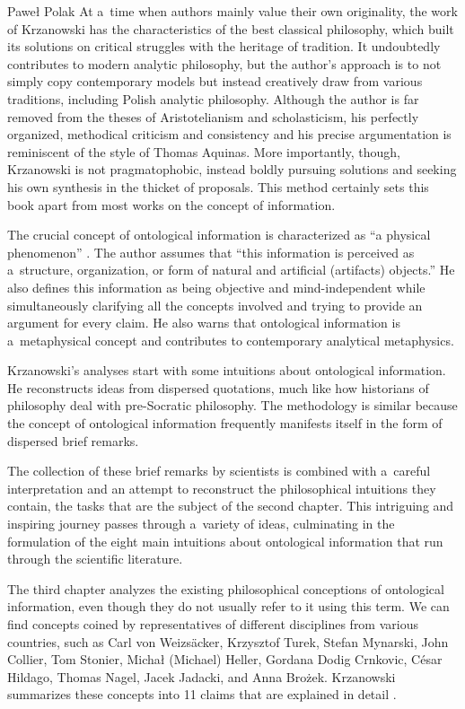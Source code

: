 \begin{newrevengenv}{Paweł Polak}
At a~time when authors mainly value their own originality, the work of Krzanowski has the characteristics of the best classical philosophy, which built its solutions on critical struggles with the heritage of tradition. It undoubtedly contributes to modern analytic philosophy, but the author's approach is to not simply copy contemporary models but instead creatively draw from various traditions, including Polish analytic philosophy. Although the author is far removed from the theses of Aristotelianism and scholasticism, his perfectly organized, methodical criticism and consistency and his precise argumentation is reminiscent of the style of Thomas Aquinas. More importantly, though, Krzanowski is not pragmatophobic, instead boldly pursuing solutions and seeking his own synthesis in the thicket of proposals. This method certainly sets this book apart from most works on the concept of information.

The crucial concept of ontological information is characterized as ``a physical phenomenon''
\parencite[][p.6]{krzanowski_ontological_2022}. %
 The author assumes that ``this information is perceived as a~structure, organization, or form of natural and artificial (artifacts) objects.'' He also defines this information as being objective and mind-independent while simultaneously clarifying all the concepts involved and trying to provide an argument for every claim. He also warns that ontological information is a~metaphysical concept and contributes to contemporary analytical metaphysics.

Krzanowski's analyses start with some intuitions about ontological information. He reconstructs ideas from dispersed quotations, much like how historians of philosophy deal with pre-Socratic philosophy. The methodology is similar because the concept of ontological information frequently manifests itself in the form of dispersed brief remarks.

The collection of these brief remarks by scientists is combined with a~careful interpretation and an attempt to reconstruct the philosophical intuitions they contain, the tasks that are the subject of the second chapter. This intriguing and inspiring journey passes through a~variety of ideas, culminating in the formulation of the eight main intuitions about ontological information that run through the scientific literature.

The third chapter analyzes the existing philosophical conceptions of ontological information, even though they do not usually refer to it using this term. We can find concepts coined by representatives of different disciplines from various countries, such as Carl von Weizsäcker, Krzysztof Turek, Stefan Mynarski, John Collier, Tom Stonier, Michał (Michael) Heller, Gordana Dodig Crnkovic, César Hildago, Thomas Nagel, Jacek Jadacki, and Anna Brożek. Krzanowski summarizes these concepts into 11 claims that are explained in detail
\parencite[][pp.86–93]{krzanowski_ontological_2022}.%



\end{newrevengenv}
